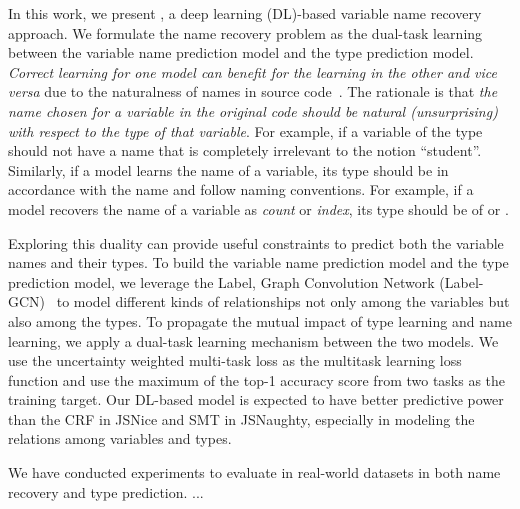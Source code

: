 


In this work, we present {\tool}, a deep learning (DL)-based variable
name recovery approach. We formulate the name recovery problem as the
dual-task learning between the variable name prediction model and the
type prediction model. {\em Correct learning for one model can benefit
  for the learning in the other and vice versa} due to the naturalness
of names in source code~\cite{hindle-icse12}. The rationale is that
{\em the name chosen for a variable in the original code should be
  natural (unsurprising) with respect to the type of that
  variable}. For example, if a variable of the type 
should not have a name that is completely irrelevant to the notion
``student''. Similarly, if a model learns the name of a variable, its
type should be in accordance with the name and follow naming
conventions. For example, if a model recovers the name of a variable
as {\em count} or {\em index}, its type should be of  or
.

Exploring this duality can provide useful constraints to predict both
the variable names and their types.  To build the variable name
prediction model and the type prediction model, we leverage the Label,
Graph Convolution Network (Label-GCN)~\cite{label-gcn} to model
different kinds of relationships not only among the variables but also
among the types. To propagate the mutual impact of type learning and
name learning, we apply a dual-task learning mechanism between the two
models. We use the uncertainty weighted multi-task loss as the
multitask learning loss function and use the maximum of the top-1
accuracy score from two tasks as the training target. Our DL-based
model is expected to have better predictive power than the CRF in
JSNice and SMT in JSNaughty, especially in modeling the relations
among variables and types.

We have conducted experiments to evaluate {\tool} in real-world
datasets in both name recovery and type prediction. ...
